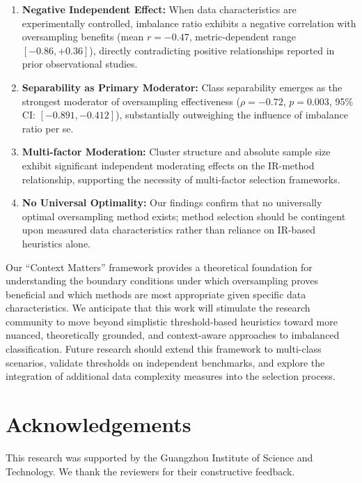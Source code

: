 \documentclass[12pt,a4paper]{article}
\theoremstyle{definition}
\begin{document}
\begin{enumerate}
 \item \textbf{Negative Independent Effect:} When data characteristics are experimentally controlled, imbalance ratio exhibits a negative correlation with oversampling benefits (mean $r=-0.47$, metric-dependent range $[-0.86, +0.36]$), directly contradicting positive relationships reported in prior observational studies.
 
 \item \textbf{Separability as Primary Moderator:} Class separability emerges as the strongest moderator of oversampling effectiveness ($\rho=-0.72$, $p=0.003$, 95\% CI: $[-0.891, -0.412]$), substantially outweighing the influence of imbalance ratio per se.
 
 \item \textbf{Multi-factor Moderation:} Cluster structure and absolute sample size exhibit significant independent moderating effects on the IR-method relationship, supporting the necessity of multi-factor selection frameworks.
 
 \item \textbf{No Universal Optimality:} Our findings confirm that no universally optimal oversampling method exists; method selection should be contingent upon measured data characteristics rather than reliance on IR-based heuristics alone.
\end{enumerate}

Our ``Context Matters'' framework provides a theoretical foundation for understanding the boundary conditions under which oversampling proves beneficial and which methods are most appropriate given specific data characteristics. We anticipate that this work will stimulate the research community to move beyond simplistic threshold-based heuristics toward more nuanced, theoretically grounded, and context-aware approaches to imbalanced classification. Future research should extend this framework to multi-class scenarios, validate thresholds on independent benchmarks, and explore the integration of additional data complexity measures into the selection process.

\section*{Acknowledgements}
\indent This research was supported by the Guangzhou Institute of Science and Technology. We thank the reviewers for their constructive feedback.
\end{document}
